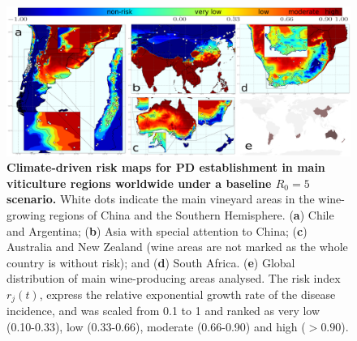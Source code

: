     \begin{figure}[b!]
        \centering
        \includegraphics[width=1\textwidth]{Figures/Fig3.pdf}
        \caption[Climate-driven risk maps for PD establishment in main
            viticulture regions worldwide]{\textbf{Climate-driven risk maps for
                PD establishment in
                main
                viticulture regions worldwide under a baseline $R_0 = 5$
                scenario.} White dots
            indicate the main vineyard areas in the wine-growing regions of
            China and the
            Southern Hemisphere. (\textbf{a}) Chile and Argentina; (\textbf{b})
            Asia with
            special attention to China; (\textbf{c}) Australia and New Zealand
            (wine areas
            are not marked as the whole country is without risk); and
            (\textbf{d}) South
            Africa. (\textbf{e}) Global distribution of main wine-producing
            areas analysed.
            The risk index $r_j(t)$, express the relative exponential growth
            rate of the
            disease incidence, and was scaled from 0.1 to 1 and ranked as very
            low
            (0.10-0.33), low (0.33-0.66), moderate (0.66-0.90) and high ($>
                0.90$).}
        \label{fig3}
    \end{figure}

